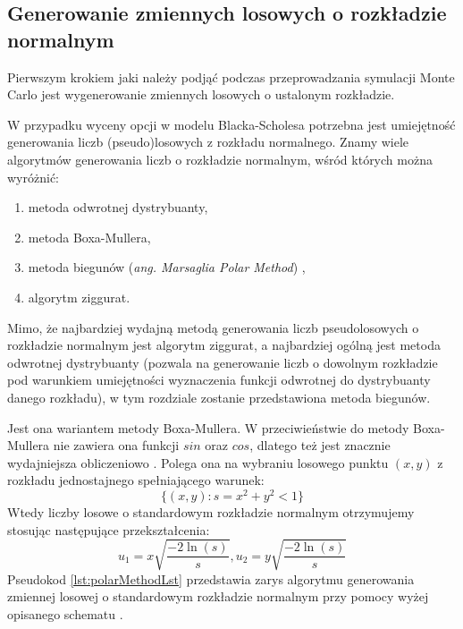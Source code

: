 \documentclass{pracamgr}
\begin{document}
\subsection{Generowanie zmiennych losowych o rozkładzie normalnym}

Pierwszym krokiem jaki należy podjąć podczas przeprowadzania symulacji Monte Carlo jest 
wygenerowanie zmiennych losowych o ustalonym rozkładzie.

W przypadku wyceny opcji w modelu Blacka-Scholesa potrzebna jest umiejętność generowania liczb 
(pseudo)losowych z rozkładu normalnego. Znamy wiele algorytmów generowania liczb o rozkładzie
normalnym, wśród których można wyróżnić:
\begin{enumerate}
  \item metoda odwrotnej dystrybuanty,
  \item metoda Boxa-Mullera,
  \item metoda biegunów (\textit{ang. Marsaglia Polar Method}) \cite{Marsaglia},
  \item algorytm ziggurat.
\end{enumerate}

Mimo, że najbardziej wydajną metodą generowania liczb pseudolosowych o rozkładzie normalnym jest 
algorytm ziggurat, a najbardziej ogólną jest metoda odwrotnej dystrybuanty (pozwala na generowanie 
liczb o dowolnym rozkładzie pod warunkiem umiejętności wyznaczenia funkcji odwrotnej do dystrybuanty 
danego rozkładu), w tym rozdziale zostanie przedstawiona metoda biegunów.

Jest ona wariantem metody Boxa-Mullera. W przeciwieństwie do 
metody Boxa-Mullera nie zawiera ona funkcji $sin$ oraz $cos$, dlatego też jest znacznie wydajniejsza 
obliczeniowo \cite{Korn}.
Polega ona na wybraniu losowego punktu $(x,y)$ z rozkładu jednostajnego spełniającego warunek:
\begin{equation}
  \{(x, y): s = x^2 + y^2 < 1\}
\end{equation}
Wtedy liczby losowe o standardowym rozkładzie normalnym otrzymujemy stosując następujące 
przekształcenia:
\begin{equation}
  u_1 = x \sqrt{\frac{-2 \ln(s)}{s}}, u_2 = y \sqrt{\frac{-2 \ln(s)}{s}}
\end{equation}
Pseudokod \ref{lst:polarMethodLst} przedstawia zarys algorytmu generowania zmiennej losowej o standardowym rozkładzie
normalnym przy pomocy wyżej opisanego schematu \cite{joshi2008c++}. 
\end{document}

